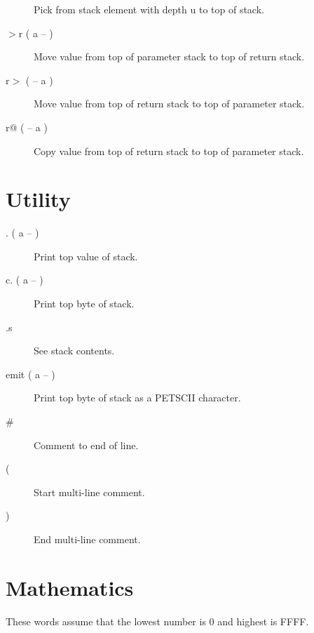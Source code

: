 \begin{description}
Pick from stack element with depth u to top of stack.

\item[$>$r ( a -- )]

Move value from top of parameter stack to top of return stack. 

\item[r$>$ ( -- a )]

Move value from top of return stack to top of parameter stack. 

\item[r@ ( -- a )]

Copy value from top of return stack to top of parameter stack. 

\end{description}

\section{Utility}

\begin{description}
\item[. ( a -- )] Print top value of stack.
\item[c. ( a -- )] Print top byte of stack.
\item[.s] See stack contents.
\item[emit ( a -- )] Print top byte of stack as a PETSCII character.
\item[\#] Comment to end of line.
\item[(] Start multi-line comment.
\item[)] End multi-line comment.
\end{description}

\section{Mathematics}

These words assume that the lowest number is 0 and highest is FFFF.

